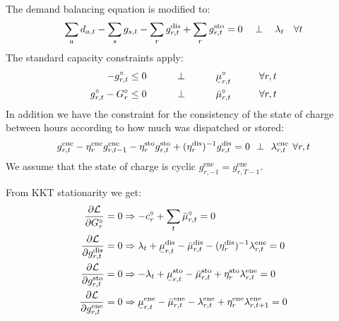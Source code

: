 \documentclass[final,3p,times]{elsarticle}
\def\l{\lambda} \def\K{\kappa} \def\m{\mu} \def\G{\Gamma} \def\d{\partial}
\def\cL{\mathcal{L}} \newcommand{\ubar}[1]{\text{\b{$#1$}}}
\begin{document}
The demand balancing equation is modified to:
\begin{equation}
  \sum_a d_{a,t} - \sum_s g_{s,t} - \sum_r g^{\textrm{dis}}_{r,t}  + \sum_r g^{\textrm{sto}}_{r,t}  =  0 \hspace{0.34cm}\perp \hspace{0.34cm} \l_t \hspace{0.34cm} \forall t
\end{equation}
The standard capacity constraints apply:
\begin{align}
  -g^\circ_{r,t}\leq 0 \hspace{1cm}\perp \hspace{1cm} \ubar{\mu}^\circ_{r,t} \hspace{1cm} \forall r,t  \label{eq:storlower} \\
  g^\circ_{r,t} - G^\circ_r \leq 0 \hspace{1cm}\perp \hspace{1cm} \bar{\mu}^\circ_{r,t} \hspace{1cm} \forall r,t \label{eq:storupper}
\end{align}
In addition we have the constraint for the consistency of the state of charge
between hours according to how much was dispatched or stored:
\begin{equation}
  g^{\textrm{ene}}_{r,t}- \eta^{\textrm{ene}}_r g^{\textrm{ene}}_{r,t-1} - \eta^{\textrm{sto}}_r g^{\textrm{sto}}_{r,t} + (\eta^{\textrm{dis}}_r)^{-1} g^{\textrm{dis}}_{r,t}  =  0 \hspace{0.14cm}\perp \hspace{0.14cm} \l^{\textrm{ene}}_{r,t} \hspace{0.14cm} \forall r,t  \label{eq:storsoc}
\end{equation}
We assume that the state of charge is cyclic $g^{\textrm{ene}}_{r,-1} =
g^{\textrm{ene}}_{r,T-1}$.

From KKT stationarity we get:
\begin{align}
  \frac{\d \cL}{\d G^\circ_{r}} = 0            & \Rightarrow - c^\circ_r + \sum_t \bar{\m}^\circ_{r,t}  = 0                                                                                                      \\
  \frac{\d \cL}{\d g^{\textrm{dis}}_{r,t}} = 0 & \Rightarrow  \l_t + \ubar{\m}^{\textrm{dis}}_{r,t} - \bar{\m}^{\textrm{dis}}_{r,t} - (\eta^{\textrm{dis}}_r)^{-1} \l^{\textrm{ene}}_{r,t}  = 0                  \\
  \frac{\d \cL}{\d g^{\textrm{sto}}_{r,t}} = 0 & \Rightarrow  -\l_t + \ubar{\m}^{\textrm{sto}}_{r,t} - \bar{\m}^{\textrm{sto}}_{r,t} + \eta^{\textrm{sto}}_r \l^{\textrm{ene}}_{r,t}  = 0                        \\
  \frac{\d \cL}{\d g^{\textrm{ene}}_{r,t}} = 0 & \Rightarrow   \ubar{\m}^{\textrm{ene}}_{r,t} - \bar{\m}^{\textrm{ene}}_{r,t} -  \l^{\textrm{ene}}_{r,t} + \eta^{\textrm{ene}}_r \l^{\textrm{ene}}_{r,t+1}   = 0
\end{align}
\end{document}
